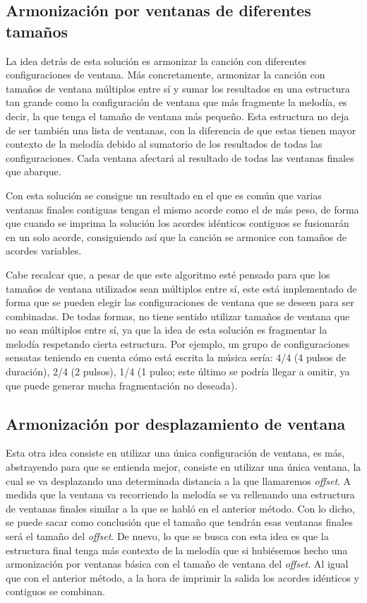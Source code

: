 \subsection{Armonización por ventanas de diferentes tamaños}\label{arm:subsubsec:ventanas_diferentes}

La idea detrás de esta solución es armonizar la canción con diferentes configuraciones de ventana. Más concretamente, armonizar la canción con tamaños de ventana múltiplos entre sí y sumar los resultados en una estructura tan grande como la configuración de ventana que más fragmente la melodía, es decir, la que tenga el tamaño de ventana más pequeño. Esta estructura no deja de ser también una lista de ventanas, con la diferencia de que estas tienen mayor contexto de la melodía debido al sumatorio de los resultados de todas las configuraciones. Cada ventana afectará al resultado de todas las ventanas finales que abarque. 

Con esta solución se consigue un resultado en el que es común que varias ventanas finales contiguas tengan el mismo acorde como el de más peso, de forma que cuando se imprima la solución los acordes idénticos contiguos se fusionarán en un solo acorde, consiguiendo así que la canción se armonice con tamaños de acordes variables. 

Cabe recalcar que, a pesar de que este algoritmo esté pensado para que los tamaños de ventana utilizados sean múltiplos entre sí, este está implementado de forma que se pueden elegir las configuraciones de ventana que se deseen para ser combinadas. De todas formas, no tiene sentido utilizar tamaños de ventana que no sean múltiplos entre sí, ya que la idea de esta solución es fragmentar la melodía respetando cierta estructura. Por ejemplo, un grupo de configuraciones sensatas teniendo en cuenta cómo está escrita la música sería: 4/4 (4 pulsos de duración), 2/4 (2 pulsos), 1/4 (1 pulso; este último se podría llegar a omitir, ya que puede generar mucha fragmentación no deseada).

\subsection{Armonización por desplazamiento de ventana}
\label{arm:subsubsec:desplazamiento_ventanas}

Esta otra idea consiste en utilizar una única configuración de ventana, es más, abstrayendo para que se entienda mejor, consiste en utilizar una única ventana, la cual se va desplazando una determinada distancia a la que llamaremos \textit{offset}. A medida que la ventana va recorriendo la melodía se va rellenando una estructura de ventanas finales similar a la que se habló en el anterior método. Con lo dicho, se puede sacar como conclusión que el tamaño que tendrán esas ventanas finales será el tamaño del \textit{offset}. De nuevo, lo que se busca con esta idea es que la estructura final tenga más contexto de la melodía que si hubiésemos hecho una armonización por ventanas básica con el tamaño de ventana del \textit{offset}. Al igual que con el anterior método, a la hora de imprimir la salida los acordes idénticos y contiguos se combinan.

